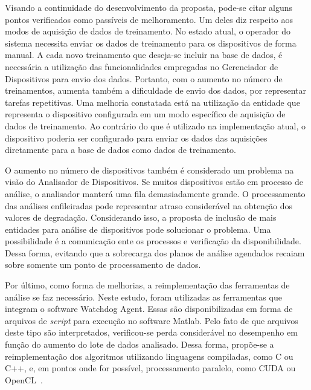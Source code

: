 Visando a continuidade do desenvolvimento da proposta, pode-se citar alguns pontos verificados como
passíveis de melhoramento. Um deles diz respeito aos modos de aquisição de dados de treinamento. No
estado atual, o operador do sistema necessita enviar os dados de treinamento para os dispositivos de
forma manual. A cada novo treinamento que deseja-se incluir na base de dados, é necessária a
utilização das funcionalidades empregadas no Gerenciador de Dispositivos para envio dos dados.
Portanto, com o aumento no número de treinamentos, aumenta também a dificuldade de envio dos dados,
por representar tarefas repetitivas. Uma melhoria constatada está na utilização da entidade que
representa o dispositivo configurada em um modo específico de aquisição de dados de treinamento. Ao
contrário do que é utilizado na implementação atual, o dispositivo poderia ser configurado para
enviar os dados das aquisições diretamente para a base de dados como dados de treinamento.

O aumento no número de dispositivos também é considerado um problema na visão do Analisador de
Dispositivos. Se muitos dispositivos estão em processo de análise, o analisador manterá uma fila
demasiadamente grande. O processamento das análises enfileiradas pode representar atraso
considerável na obtenção dos valores de degradação. Considerando isso, a proposta de inclusão de
mais entidades para análise de dispositivos pode solucionar o problema. Uma possibilidade é a
comunicação ente os processos e verificação da disponibilidade. Dessa forma, evitando que a
sobrecarga dos planos de análise agendados recaiam sobre somente um ponto de processamento de dados.

Por último, como forma de melhorias, a reimplementação das ferramentas de análise se faz necessário.
Neste estudo, foram utilizadas as ferramentas que integram o software Watchdog Agent. Essas são
disponibilizadas em forma de arquivos de \textit{script} para execução no software Matlab. Pelo fato
de que arquivos deste tipo são interpretados, verificou-se perda considerável no desempenho em
função do aumento do lote de dados analisado. Dessa forma, propõe-se a reimplementação dos
algoritmos utilizando linguagens compiladas, como C ou C++, e, em pontos onde for possível,
processamento paralelo, como CUDA ou OpenCL~\cite{kirk2012programming}.
